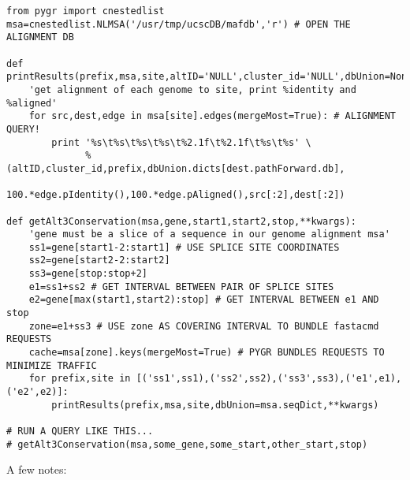 \documentclass{howto}
\begin{document}
\begin{verbatim}
from pygr import cnestedlist
msa=cnestedlist.NLMSA('/usr/tmp/ucscDB/mafdb','r') # OPEN THE ALIGNMENT DB

def printResults(prefix,msa,site,altID='NULL',cluster_id='NULL',dbUnion=None):
    'get alignment of each genome to site, print %identity and %aligned'
    for src,dest,edge in msa[site].edges(mergeMost=True): # ALIGNMENT QUERY!
        print '%s\t%s\t%s\t%s\t%2.1f\t%2.1f\t%s\t%s' \
              %(altID,cluster_id,prefix,dbUnion.dicts[dest.pathForward.db],
                100.*edge.pIdentity(),100.*edge.pAligned(),src[:2],dest[:2])

def getAlt3Conservation(msa,gene,start1,start2,stop,**kwargs):
    'gene must be a slice of a sequence in our genome alignment msa'
    ss1=gene[start1-2:start1] # USE SPLICE SITE COORDINATES
    ss2=gene[start2-2:start2]
    ss3=gene[stop:stop+2]
    e1=ss1+ss2 # GET INTERVAL BETWEEN PAIR OF SPLICE SITES
    e2=gene[max(start1,start2):stop] # GET INTERVAL BETWEEN e1 AND stop
    zone=e1+ss3 # USE zone AS COVERING INTERVAL TO BUNDLE fastacmd REQUESTS
    cache=msa[zone].keys(mergeMost=True) # PYGR BUNDLES REQUESTS TO MINIMIZE TRAFFIC
    for prefix,site in [('ss1',ss1),('ss2',ss2),('ss3',ss3),('e1',e1),('e2',e2)]:
        printResults(prefix,msa,site,dbUnion=msa.seqDict,**kwargs)

# RUN A QUERY LIKE THIS...
# getAlt3Conservation(msa,some_gene,some_start,other_start,stop)

\end{verbatim}

A few notes:
\end{document}
